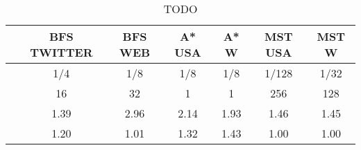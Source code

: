 \begin{table}[h]
\centring
\begin{tabular}{ |c|c|c|c|c|c|c| }
\hline
 & \large{\textbf{BFS TWITTER}} & \large{\textbf{BFS WEB}} & \large{\textbf{A* USA}} & \large{\textbf{A* W}} & \large{\textbf{MST USA}} & \large{\textbf{MST W}} \\
\hline
\insprob{} & 1/4 & 1/8 & 1/8 & 1/8 & 1/128 & 1/32 \\
\hline
\delbatch{} & 16 & 32 & 1 & 1 & 256 & 128 \\
\hline
\speed{} & 1.39 & 2.96 & 2.14 & 1.93 & 1.46 & 1.45 \\
\hline
\workinc{} & 1.20 & 1.01 & 1.32 & 1.43 & 1.00 & 1.00 \\
\hline
\end{tabular}
\vspace{0.3em}
\caption{TODO }
\label{table:todo}
\end{table}
